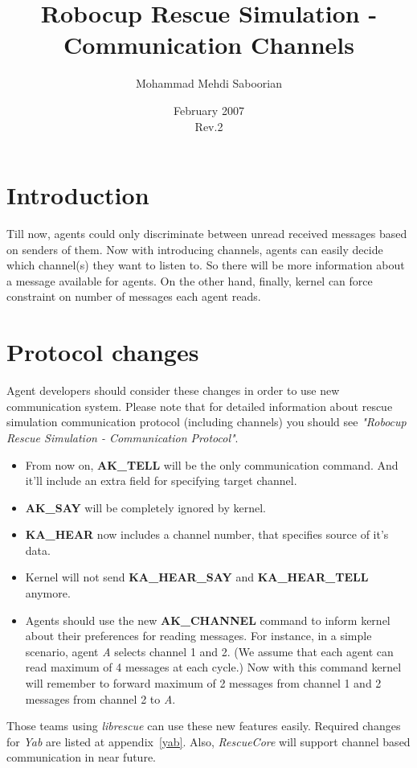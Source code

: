 \documentclass{article}
\title {Robocup Rescue Simulation - Communication Channels}
\author {Mohammad Mehdi Saboorian}
\date{February 2007\\Rev.2}
\begin{document}
\maketitle
\section{Introduction}
Till now, agents could only discriminate between unread received
messages based on senders of them. Now with introducing channels,
agents can easily decide which channel(s) they want to listen to. So
there will be more information about a message available for agents.
On the other hand, finally, kernel can force constraint on number of
messages each agent reads.

\section{Protocol changes}
Agent developers should consider these changes in order to use new
communication system. Please note that for detailed information
about rescue simulation communication protocol (including channels)
you should see {\sl "Robocup Rescue Simulation - Communication
Protocol"}.
\begin{itemize}
	\item From now on, \textbf{AK\_TELL} will be the only communication
	command. And it'll include an extra field for specifying target channel.
	\item \textbf{AK\_SAY} will be completely ignored by kernel.
	\item \textbf{KA\_HEAR} now includes a channel number, that
	specifies source of it's data.
	\item Kernel will not send \textbf{KA\_HEAR\_SAY} and 
	\textbf{KA\_HEAR\_TELL} anymore.
	\item Agents should use the new \textbf{AK\_CHANNEL} command to
	inform kernel about their preferences for reading messages.
	For instance, in a simple scenario, agent \textsl{A} selects
	channel 1 and 2. (We assume that each agent can read maximum of 4
	messages at each cycle.) Now with this command kernel will remember
	to forward maximum of 2 messages from channel 1 and 2 messages from
	channel 2 to \textsl{A}.
\end{itemize}

Those teams using \textsl{librescue} can use these new features easily.
Required changes for \textsl{Yab} are listed at appendix~\ref{yab}. Also, 
\textsl{RescueCore} will support channel based communication in near
future.
\end{document}
